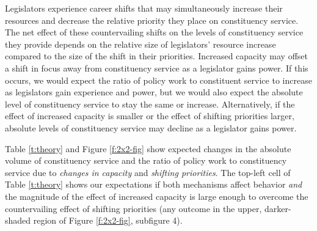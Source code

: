 \documentclass[12pt]{article}
\begin{document}
Legislators experience career shifts that may simultaneously increase their resources and decrease the relative priority they place on constituency service. The net effect of these countervailing shifts on the levels of constituency service they provide depends on the relative size of legislators' resource increase compared to the size of the shift in their priorities. Increased capacity may offset a shift in focus away from constituency service as a legislator gains power. If this occurs, we would expect the ratio of policy work to constituent service to increase as legislators gain experience and power, but we would also expect the absolute level of constituency service to stay the same or increase. Alternatively, if the effect of increased capacity is smaller or the effect of shifting priorities larger, absolute levels of constituency service may decline as a legislator gains power.


Table \ref{t:theory} and Figure \ref{f:2x2-fig} show expected changes in the absolute volume of constituency service and the ratio of policy work to constituency service due to \textit{changes in capacity} and \textit{shifting priorities}. The top-left cell of Table \ref{t:theory} shows our expectations if both mechanisms affect behavior \textit{and} the magnitude of the effect of increased capacity is large enough to overcome the countervailing effect of shifting priorities (any outcome in the upper, darker-shaded region of Figure \ref{f:2x2-fig}, subfigure 4).
\end{document}
